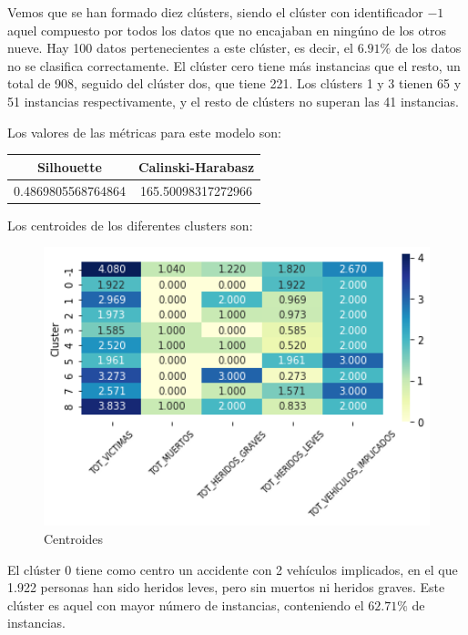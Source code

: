 \documentclass[a4]{article}
\begin{document}
Vemos que se han formado diez clústers, siendo el clúster con identificador $-1$  aquel compuesto por todos los datos que no encajaban en ningúno de los otros nueve. Hay 100 datos pertenecientes a este clúster, es decir, el $6.91\%$ de los datos no se clasifica correctamente. El clúster cero tiene más instancias que el resto, un total de 908, seguido del clúster dos, que tiene 221. Los clústers 1 y 3 tienen 65 y 51 instancias respectivamente, y el resto de clústers no superan las 41 instancias.

Los valores de las métricas para este modelo son:

\begin{center}
\begin{tabular}{|c|c|}
\hline
\multicolumn{1}{|c|}{\textbf{Silhouette}} & \textbf{Calinski-Harabasz}\\ \hline
  0.4869805568764864  & 165.50098317272966  \\ \hline
\end{tabular}
\end{center}

Los centroides de los diferentes clusters son:

\begin{figure}[H]
  \centering
  \caption{Centroides}
  \includegraphics[width=130mm]{imagenes/c1_dbscan_centroides}
\end{figure}

El clúster 0 tiene como centro un accidente con 2 vehículos implicados, en el que 1.922 personas han sido heridos leves, pero sin muertos ni heridos graves. Este clúster es aquel con mayor número de instancias, conteniendo el $62.71\%$ de instancias.
\end{document}

